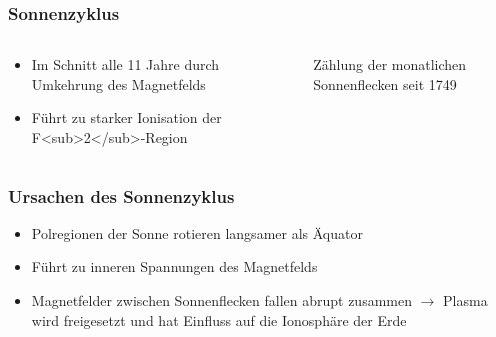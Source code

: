 \begin{frame}

\end{frame}

\begin{frame}
\frametitle{Sonnenzyklus}
\begin{columns}
    \begin{column}{0.48\textwidth}
    \begin{itemize}
  \item Im Schnitt alle 11 Jahre durch Umkehrung des Magnetfelds
  \item Führt zu starker Ionisation der F<sub>2</sub>-Region
  \end{itemize}

    \end{column}
   \begin{column}{0.48\textwidth}
       
\begin{figure}
    \caption{\scriptsize Zählung der monatlichen Sonnenflecken seit 1749}
    \label{e_sonnenzyklus}
\end{figure}


   \end{column}
\end{columns}

\end{frame}

\begin{frame}
\frametitle{Ursachen des Sonnenzyklus}
\begin{itemize}
  \item Polregionen der Sonne rotieren langsamer als Äquator
  \item Führt zu inneren Spannungen des Magnetfelds
  \item Magnetfelder zwischen Sonnenflecken fallen abrupt zusammen $\rightarrow$ Plasma wird freigesetzt und hat Einfluss auf die Ionosphäre der Erde
  \end{itemize}
\end{frame}

